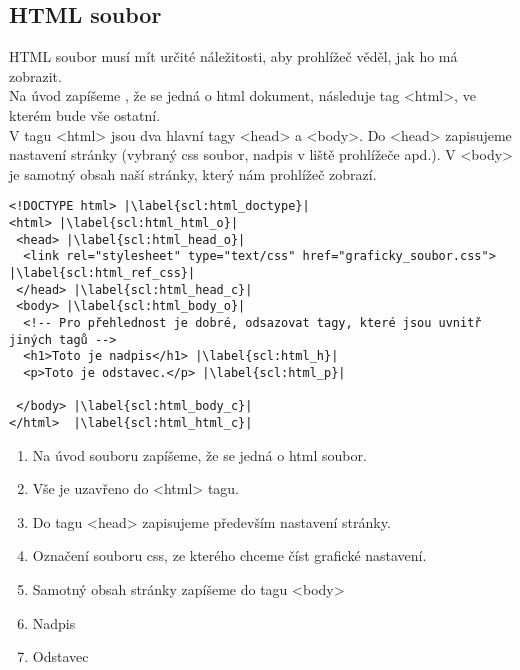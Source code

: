 \subsection{HTML soubor}
HTML soubor musí mít určité náležitosti, aby prohlížeč věděl, jak ho má zobrazit.\\
Na úvod zapíšeme , že se jedná o html dokument, následuje tag <html>, ve kterém bude vše ostatní.\\
V tagu <html> jsou dva hlavní tagy <head> a <body>. Do <head> zapisujeme nastavení stránky (vybraný css soubor, nadpis v liště prohlížeče apd.). V <body> je samotný obsah naší stránky, který nám prohlížeč zobrazí.\\
\begin{minipage}[t]{.45\textwidth}
\begin{code}
\begin{verbatim}
<!DOCTYPE html> |\label{scl:html_doctype}|
<html> |\label{scl:html_html_o}|
 <head> |\label{scl:html_head_o}|
  <link rel="stylesheet" type="text/css" href="graficky_soubor.css"> |\label{scl:html_ref_css}|
 </head> |\label{scl:html_head_c}|
 <body> |\label{scl:html_body_o}|
  <!-- Pro přehlednost je dobré, odsazovat tagy, které jsou uvnitř jiných tagů -->
  <h1>Toto je nadpis</h1> |\label{scl:html_h}|
  <p>Toto je odstavec.</p> |\label{scl:html_p}|

 </body> |\label{scl:html_body_c}|
</html>  |\label{scl:html_html_c}|
\end{verbatim}

\label{code:html_uvod}
\end{code}
\end{minipage}
\begin{minipage}[t]{.45\textwidth}
\begin{enumerate}
\vspace{-0.4cm}
\item[ř. \ref{scl:html_doctype}:] Na úvod souboru zapíšeme, že se jedná o html soubor.
\item[ř. \ref{scl:html_html_o}-\ref{scl:html_html_c}:] Vše je uzavřeno do <html> tagu.
\vspace{0.2cm}
\item[ř. \ref{scl:html_head_o}-\ref{scl:html_head_c}:] Do tagu <head> zapisujeme především nastavení stránky.
\item[ř. \ref{scl:html_ref_css}:] Označení souboru css, ze kterého chceme číst grafické nastavení.
\item[ř. \ref{scl:html_body_o}-\ref{scl:html_body_c}:] Samotný obsah stránky zapíšeme do tagu <body>
\item[ř. \ref{scl:html_h}:] Nadpis 
\item[ř. \ref{scl:html_p}:] Odstavec
\end{enumerate}
\end{minipage}\\

